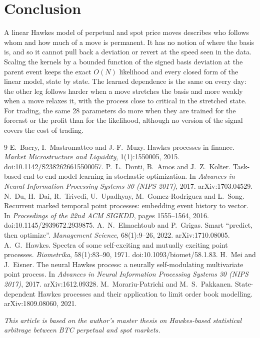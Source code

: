 \documentclass[a4paper,11pt]{article}
\begin{document}
\section{Conclusion}

A linear Hawkes model of perpetual and spot price moves describes who follows whom and how much of a move is permanent. It has no notion of where the basis is, and so it cannot pull back a deviation or revert at the speed seen in the data. Scaling the kernels by a bounded function of the signed basis deviation at the parent event keeps the exact $O(N)$ likelihood and every closed form of the linear model, state by state. The learned dependence is the same on every day: the other leg follows harder when a move stretches the basis and more weakly when a move relaxes it, with the process close to critical in the stretched state. For trading, the same 28 parameters do more when they are trained for the forecast or the profit than for the likelihood, although no version of the signal covers the cost of trading.

\begin{thebibliography}{9}
 E.~Bacry, I.~Mastromatteo and J.-F.~Muzy. Hawkes processes in finance. \emph{Market Microstructure and Liquidity}, 1(1):1550005, 2015. doi:10.1142/S2382626615500057.
 P.~L.~Donti, B.~Amos and J.~Z.~Kolter. Task-based end-to-end model learning in stochastic optimization. In \emph{Advances in Neural Information Processing Systems 30 (NIPS 2017)}, 2017. arXiv:1703.04529.
 N.~Du, H.~Dai, R.~Trivedi, U.~Upadhyay, M.~Gomez-Rodriguez and L.~Song. Recurrent marked temporal point processes: embedding event history to vector. In \emph{Proceedings of the 22nd ACM SIGKDD}, pages 1555--1564, 2016. doi:10.1145/2939672.2939875.
 A.~N.~Elmachtoub and P.~Grigas. Smart ``predict, then optimize''. \emph{Management Science}, 68(1):9--26, 2022. arXiv:1710.08005.
 A.~G.~Hawkes. Spectra of some self-exciting and mutually exciting point processes. \emph{Biometrika}, 58(1):83--90, 1971. doi:10.1093/biomet/58.1.83.
 H.~Mei and J.~Eisner. The neural Hawkes process: a neurally self-modulating multivariate point process. In \emph{Advances in Neural Information Processing Systems 30 (NIPS 2017)}, 2017. arXiv:1612.09328.
 M.~Morariu-Patrichi and M.~S.~Pakkanen. State-dependent Hawkes processes and their application to limit order book modelling. arXiv:1809.08060, 2021.
\end{thebibliography}

\vspace{1em}
\noindent\textit{This article is based on the author's master thesis on Hawkes-based statistical arbitrage between BTC perpetual and spot markets.}
\end{document}
